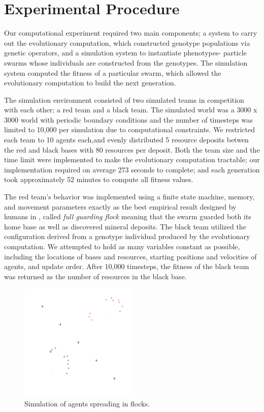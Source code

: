 \documentclass[12pt,journal,compsoc]{IEEEtran}
\begin{document}
\section{Experimental Procedure}

Our computational experiment required two main components; a system to carry out the evolutionary computation, which constructed genotype populations via genetic operators, and a simulation system to instantiate phenotypes- particle swarms whose individuals are constructed from the genotypes. The simulation system computed the fitness of a particular swarm, which allowed the evolutionary computation to build the next generation.

The simulation environment consisted of two simulated teams in competition with each other; a red team and a black team. The simulated world was a 3000 x 3000 world with periodic boundary conditions and the number of timesteps was limited to 10,000 per simulation due to computational constraints. We restricted each team to 10 agents each,and evenly distributed 5 resource deposits betwen the red and black bases with 80 resources per deposit. Both the team size and the time limit were implemented to make the evolutionary computation tractable; our implementation required on average 273 seconds to complete; and each generation took approximately 52 minutes to compute all fitness values.

The red team's behavior was implemented using a finite state machine, memory, and movement parameters exactly as the best empirical result designed by humans in \cite{rodriguez2004extending}, called \textit{full guarding flock} meaning that the swarm guarded both its home base as well as discovered mineral deposits. The black team utilized the configuration derived from a genotype individual produced by the evolutionary computation. We attempted to hold as many variables constant as possible, including the locations of bases and resources, starting positions and velocities of agents, and update order. After 10,000 timesteps, the fitness of the black team was returned as the number of resources in the black base.

\begin{figure}[h!]
    \centering
        \includegraphics[width=0.5\textwidth]{figures/simulation}
    \caption{Simulation of agents spreading in flocks.}
\end{figure}
\end{document}
